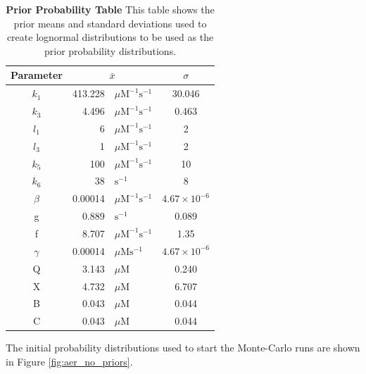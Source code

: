 \begin{table}[ht]%
\renewcommand{\arraystretch}{1.5}
\begin{center}
\begin{tabular}{crlc}
\toprule
\textbf{Parameter} & \multicolumn{2}{c}{${\bar{x}}$} & $\sigma$\\
\midrule
$k_1$ & 413.228 & $\mu \mathrm{M}^{-1}\mathrm{s}^{-1}$ & 30.046\\
$k_3$ & 4.496 & $\mu \mathrm{M}^{-1}\mathrm{s}^{-1}$  & 0.463\\
$l_1$ & 6 & $\mu \mathrm{M}^{-1}\mathrm{s}^{-1}$  & 2\\
$l_3$ & 1 & $\mu \mathrm{M}^{-1}\mathrm{s}^{-1}$  & 2\\
$k_5$ & 100 & $\mu \mathrm{M}^{-1}\mathrm{s}^{-1}$  & 10\\
$k_6$ & 38 & $\mathrm{s}^{-1}$  & 8\\
$\beta$ & 0.00014 & $\mu \mathrm{M}^{-1}\mathrm{s}^{-1}$  & $4.67\times 10^{-6}$\\
g & 0.889 & $\mathrm{s}^{-1}$  & 0.089\\
f & 8.707 & $\mu \mathrm{M}^{-1}\mathrm{s}^{-1}$  & 1.35\\
$\gamma$ & 0.00014 & $\mu \mathrm{M}\mathrm{s}^{-1}$  & $4.67\times 10^{-6}$\\
Q & 3.143 & $\mu \mathrm{M}$ & 0.240\\
X & 4.732 & $\mu \mathrm{M}$ & 6.707\\
B & 0.043 & $\mu \mathrm{M}$ & 0.044\\
C & 0.043 & $\mu \mathrm{M}$ & 0.044\\
\bottomrule
\end{tabular}
\end{center}
\caption[Prior Probability Table]{{\bf Prior Probability Table} This table shows the prior means and standard deviations used to create lognormal distributions to be used as the prior probability distributions.
\label{tab:noProbstat1}}
\end{table}
\afterpage{\clearpage}
The initial probability distributions used to start the Monte-Carlo runs are shown in Figure \ref{fig:aer_no_priors}.
